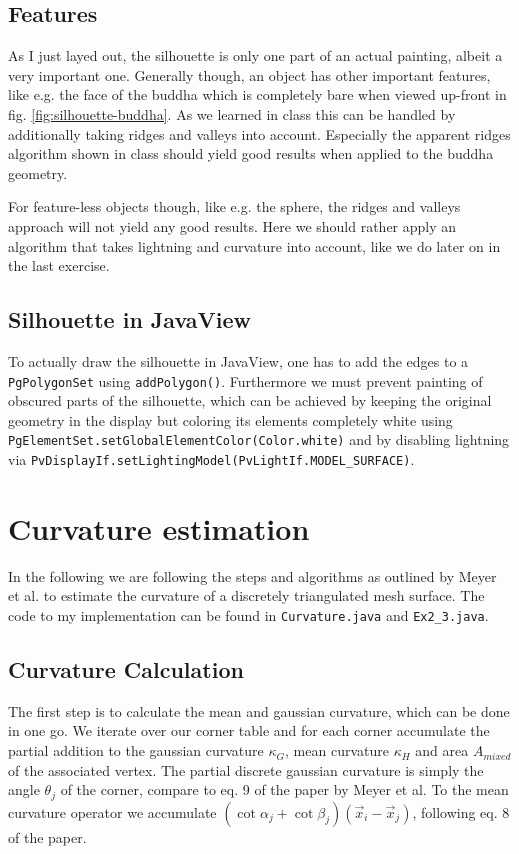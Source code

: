 \documentclass[a4paper,10pt,notitlepage]{scrreprt}
\begin{document}
\section{Features}

As I just layed out, the silhouette is only one part of an actual painting,
albeit a very important one. Generally though, an object has other important
features, like e.g. the face of the buddha which is completely bare when viewed
up-front in fig. \ref{fig:silhouette-buddha}. As we learned in class this can
be handled by additionally taking ridges and valleys into account. Especially
the apparent ridges algorithm shown in class should yield good results when
applied to the buddha geometry.

For feature-less objects though, like e.g. the sphere, the ridges and
valleys approach will not yield any good results. Here we should rather apply
an algorithm that takes lightning and curvature into account, like we do later
on in the last exercise.

\section{Silhouette in JavaView}

To actually draw the silhouette in JavaView, one has to add the edges to a
\texttt{PgPolygonSet} using \texttt{addPolygon()}. Furthermore we must prevent
painting of obscured parts of the silhouette, which can be achieved by
keeping the original geometry in the display but coloring its elements
completely white using \texttt{PgElementSet.setGlobalElementColor(Color.white)}
and by disabling lightning via
\texttt{PvDisplayIf.setLightingModel(PvLightIf.MODEL\_SURFACE)}.

\chapter{Curvature estimation}

In the following we are following the steps and algorithms as outlined by Meyer
et al. to estimate the curvature of a discretely triangulated mesh surface. The
code to my implementation can be found in \texttt{Curvature.java} and
\texttt{Ex2\_3.java}.

\section{Curvature Calculation}

The first step is to calculate the mean and gaussian curvature, which can be
done in one go. We iterate over our corner table and for each corner accumulate
the partial addition to the gaussian curvature $\kappa_G$, mean curvature
$\kappa_H$ and area $A_{mixed}$ of the associated vertex. The partial discrete
gaussian curvature is simply the angle $\theta_j$ of the corner, compare to eq.
9 of the paper by Meyer et al. To the mean curvature operator we accumulate
$(\cot \alpha_j + \cot \beta_j) (\vec{x}_i - \vec{x}_j)$, following eq. 8 of the
paper.
\end{document}
